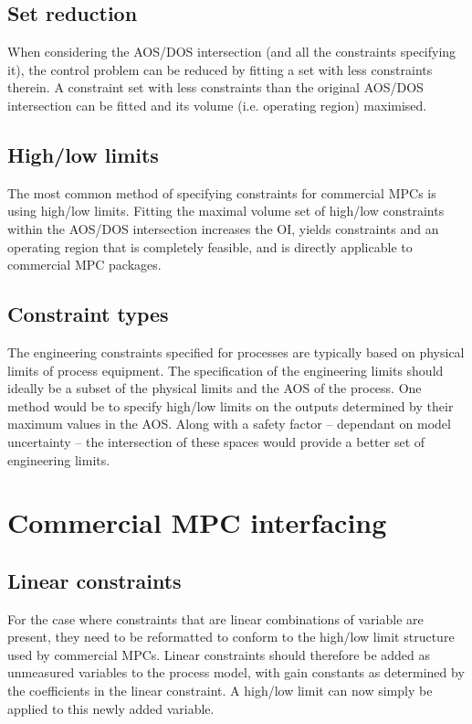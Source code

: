 \subsection{Set reduction}
When considering the AOS/DOS intersection (and all the constraints specifying it), the control problem can be reduced by fitting a set with less constraints therein.
A constraint set with less constraints than the original AOS/DOS intersection can be fitted and its volume (i.e. operating region) maximised. 
\subsection{High/low limits}
The most common method of specifying constraints for commercial MPCs is using high/low limits.
Fitting the maximal volume set of high/low constraints within the AOS/DOS intersection increases the OI, yields constraints and an operating region that is completely feasible, and is directly applicable to commercial MPC packages.
\subsection{Constraint types}
The engineering constraints specified for processes are typically based on physical limits of process equipment.
The specification of the engineering limits should ideally be a subset of the physical limits and the AOS of the process.
One method would be to specify high/low limits on the outputs determined by their maximum values in the AOS.
Along with a safety factor -- dependant on model uncertainty -- the intersection of these spaces would provide a better set of engineering limits.

\section{Commercial MPC interfacing}
\subsection{Linear constraints}
For the case where constraints that are linear combinations of variable are present, they need to be reformatted to conform to the high/low limit structure used by commercial MPCs.
Linear constraints should therefore be added as unmeasured variables to the process model, with gain constants as determined by the coefficients in the linear constraint.
A high/low limit can now simply be applied to this newly added variable.

